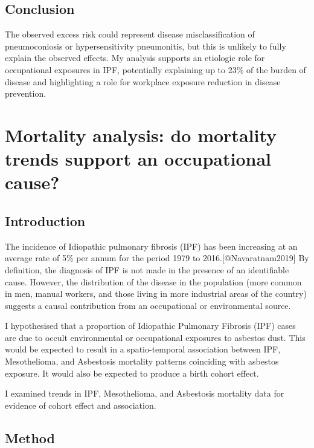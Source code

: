 \documentclass[
]{article}
\begin{document}
\hypertarget{conclusion}{%
\subsection{Conclusion}\label{conclusion}}

The observed excess risk could represent disease misclassification of
pneumoconiosis or hypersensitivity pneumonitis, but this is unlikely to
fully explain the observed effects. My analysis supports an etiologic
role for occupational exposures in IPF, potentially explaining up to
23\% of the burden of disease and highlighting a role for workplace
exposure reduction in disease prevention.

\hypertarget{mortality-analysis-do-mortality-trends-support-an-occupational-cause}{%
\section{Mortality analysis: do mortality trends support an occupational
cause?}\label{mortality-analysis-do-mortality-trends-support-an-occupational-cause}}

\hypertarget{introduction-1}{%
\subsection{Introduction}\label{introduction-1}}

The incidence of Idiopathic pulmonary fibrosis (IPF) has been increasing
at an average rate of 5\% per annum for the period 1979 to
2016.{[}@Navaratnam2019{]} By definition, the diagnosis of IPF is not
made in the presence of an identifiable cause. However, the distribution
of the disease in the population (more common in men, manual workers,
and those living in more industrial areas of the country) suggests a
causal contribution from an occupational or environmental source.

I hypothesised that a proportion of Idiopathic Pulmonary Fibrosis (IPF)
cases are due to occult environmental or occupational exposures to
asbestos dust. This would be expected to result in a spatio-temporal
association between IPF, Mesothelioma, and Asbestosis mortality patterns
coinciding with asbestos exposure. It would also be expected to produce
a birth cohort effect.

I examined trends in IPF, Mesothelioma, and Asbestosis mortality data
for evidence of cohort effect and association.

\hypertarget{method-1}{%
\subsection{Method}\label{method-1}}
\end{document}
